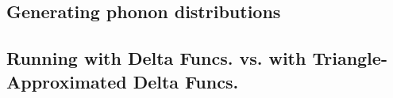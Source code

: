 \documentclass[a4paper]{article}
\begin{document}
\subsection{Generating phonon distributions}




\subsection{Running with Delta Funcs. vs. with Triangle-Approximated Delta Funcs.}
\end{document}
